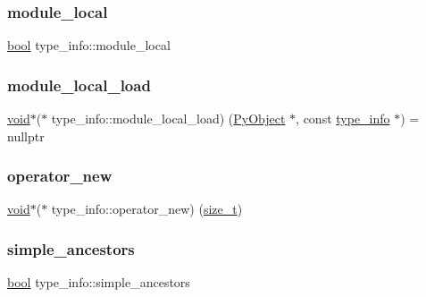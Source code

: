 \mbox{\label{structtype__info_a800bae8b10c62683b4367268a37be661}} 
\subsubsection{\texorpdfstring{module\_local}{module\_local}}
{\footnotesize\ttfamily \mbox{\hyperlink{asdl_8h_af6a258d8f3ee5206d682d799316314b1}{bool}} type\+\_\+info\+::module\+\_\+local}

\mbox{\label{structtype__info_a22057dde59f6dac304c12c97286222c8}} 
\subsubsection{\texorpdfstring{module\_local\_load}{module\_local\_load}}
{\footnotesize\ttfamily \mbox{\hyperlink{_s_d_l__opengles2__gl2ext_8h_ae5d8fa23ad07c48bb609509eae494c95}{void}}$\ast$($\ast$ type\+\_\+info\+::module\+\_\+local\+\_\+load) (\mbox{\hyperlink{_python27_2object_8h_aadc84ac7aed2cfa6f20c25f62bf3dac7}{Py\+Object}} $\ast$, const \mbox{\hyperlink{structtype__info}{type\+\_\+info}} $\ast$) = nullptr}

\mbox{\label{structtype__info_ad4d8bc132b993129bfdd1556f3c3d001}} 
\subsubsection{\texorpdfstring{operator\_new}{operator\_new}}
{\footnotesize\ttfamily \mbox{\hyperlink{_s_d_l__opengles2__gl2ext_8h_ae5d8fa23ad07c48bb609509eae494c95}{void}}$\ast$($\ast$ type\+\_\+info\+::operator\+\_\+new) (\mbox{\hyperlink{detail_2common_8h_a801d6a451a01953ef8cbae6feb6a3638}{size\+\_\+t}})}

\mbox{\label{structtype__info_aaa5c825d7f12a1312174bd566e825199}} 
\subsubsection{\texorpdfstring{simple\_ancestors}{simple\_ancestors}}
{\footnotesize\ttfamily \mbox{\hyperlink{asdl_8h_af6a258d8f3ee5206d682d799316314b1}{bool}} type\+\_\+info\+::simple\+\_\+ancestors}

